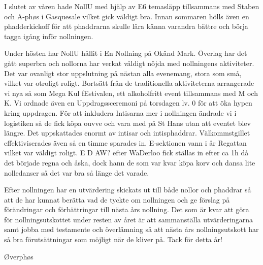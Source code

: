 \documentclass[../_main/handlingar.tex]{subfiles}
\begin{document}
\vspace{8px}

I slutet av våren hade NollU med hjälp av E6 temasläpp tillsammans med Staben och A-phøs i Gasquesale vilket gick väldigt bra. Innan sommaren hölls även en phadderkickoff för att phaddrarna skulle lära känna varandra bättre och börja tagga igång inför nollningen. 

Under hösten har NollU hållit i En Nollning på Okänd Mark. Överlag har det gått superbra och nollorna har verkat väldigt nöjda med nollningens aktiviteter. Det var ovanligt stor uppslutning på nästan alla evenemang, stora som små, vilket var otroligt roligt. Bortsätt från de traditionella aktiviteterna arrangerade vi nya så som Mega Kul fEstivalen, ett alkoholfritt event tillsammans med M och K. Vi ordnade även en Uppdragssceremoni på torsdagen lv. 0 för att öka hypen kring uppdragen. För att inkludera Intisarna mer i nollningen ändrade vi i logistiken så de fick köpa ouvve och vara med på St Hans utan att eventet blev längre. Det uppskattades enormt av intisar och intisphaddrar. Välkommstgillet effektiviserades även så en timme sparades in. E-sektionen vann i år Regattan vilket var väldigt roligt. E D AW? efter WaDerloo fick ställas in efter ca 1h då det började regna och åska, dock hann de som var kvar köpa korv och dansa lite nolledanser så det var bra så länge det varade.

Efter nollningen har en utvärdering skickats ut till både nollor och phaddrar så att de har kunnat berätta vad de tyckte om nollningen och ge förslag på förändringar och förbättringar till nästa års nollning. Det som är kvar att göra för nollningsutskottet under resten av året är att sammanställa utvärderingarna samt jobba med testamente och överlämning så att nästa års nollningsutskott har så bra förutsättningar som möjligt när de kliver på. Tack för detta år!


\begin{signatures}{1}
    \mvh
    \signature{Stephanie Bol}{Øverphøs}
\end{signatures}
\end{document}
